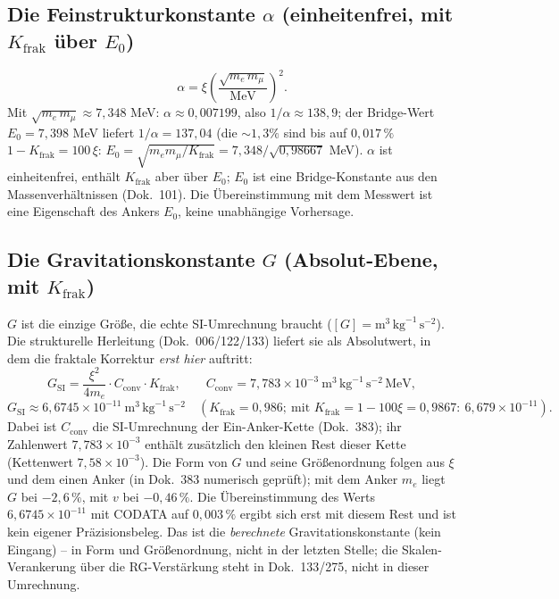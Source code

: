 \subsection{Die Feinstrukturkonstante $\alpha$ (einheitenfrei, mit $K_{\text{frak}}$ \"uber $E_0$)}
\[
\alpha=\xi\left(\frac{\sqrt{m_e\,m_\mu}}{\text{MeV}}\right)^2 .
\]
Mit $\sqrt{m_e\,m_\mu}\approx 7{,}348$ MeV: $\alpha\approx 0{,}007199$, also $1/\alpha\approx 138{,}9$;
der Bridge-Wert $E_0=7{,}398$ MeV liefert $1/\alpha=137{,}04$ (die $\sim1{,}3\%$ sind bis auf $0{,}017\,\%$
$1-K_{\text{frak}} = 100\,\xi$: $E_0 = \sqrt{m_e m_\mu/K_{\text{frak}}} = 7{,}348/\sqrt{0{,}98667}$ MeV). $\alpha$ ist einheitenfrei, enth\"alt $K_{\text{frak}}$ aber \"uber $E_0$; $E_0$ ist eine
Bridge-Konstante aus den Massenverh\"altnissen (Dok.~101). Die \"Ubereinstimmung mit dem Messwert ist eine
Eigenschaft des Ankers $E_0$, keine unabh\"angige Vorhersage.

\subsection{Die Gravitationskonstante $G$ (Absolut-Ebene, mit $K_{\text{frak}}$)}
$G$ ist die einzige Gr\"o\ss e, die echte SI-Umrechnung braucht
($[G]=\text{m}^3\,\text{kg}^{-1}\,\text{s}^{-2}$). Die strukturelle Herleitung (Dok.~006/122/133)
liefert sie als Absolutwert, in dem die fraktale Korrektur \emph{erst hier} auftritt:
\[
G_{\text{SI}}=\frac{\xi^2}{4m_e}\cdot C_{\text{conv}}\cdot K_{\text{frak}},
\qquad C_{\text{conv}}=7{,}783\times10^{-3}\ \text{m}^3\,\text{kg}^{-1}\,\text{s}^{-2}\,\text{MeV},
\]
\[
G_{\text{SI}}\approx 6{,}6745\times10^{-11}\ \text{m}^3\,\text{kg}^{-1}\,\text{s}^{-2}
\quad (K_{\text{frak}}=0{,}986;\ \text{mit } K_{\text{frak}}=1-100\xi=0{,}9867:\ 6{,}679\times10^{-11}).
\]
Dabei ist $C_{\text{conv}}$ die SI-Umrechnung der Ein-Anker-Kette (Dok.~383); ihr Zahlenwert
$7{,}783\times10^{-3}$ enthält zusätzlich den kleinen Rest dieser Kette (Kettenwert $7{,}58\times10^{-3}$).
Die Form von $G$ und seine Größenordnung folgen aus $\xi$ und dem einen Anker (in Dok.~383 numerisch
geprüft); mit dem Anker $m_e$ liegt $G$ bei $-2{,}6\,\%$, mit $v$ bei $-0{,}46\,\%$. Die Übereinstimmung
des Werts $6{,}6745\times10^{-11}$ mit CODATA auf $0{,}003\,\%$ ergibt sich erst mit diesem Rest und ist
kein eigener Präzisionsbeleg.
Das ist die \emph{berechnete} Gravitationskonstante (kein Eingang) -- in Form und Größenordnung, nicht in
der letzten Stelle; die Skalen-Verankerung \"uber die
RG-Verst\"arkung steht in Dok.~133/275, nicht in dieser Umrechnung.

